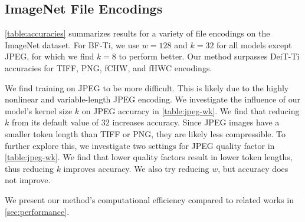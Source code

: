 \subsection{ImageNet File Encodings}
\autoref{table:accuracies} summarizes results for a variety of file encodings on the ImageNet dataset. For BF-Ti, we use $w=128$ and $k=32$ for all models except JPEG, for which we find $k=8$ to perform better. Our method surpasses DeiT-Ti accuracies for TIFF, PNG, fCHW, and fHWC encodings.

We find training on JPEG to be more difficult. This is likely due to the highly nonlinear and variable-length JPEG encoding. We investigate the influence of our model's kernel size $k$ on JPEG accuracy in \autoref{table:jpeg-wk}. We find that reducing $k$ from its default value of $32$ increases accuracy. Since JPEG images have a smaller token length than TIFF or PNG, they are likely less compressible. To further explore this, we investigate two settings for JPEG quality factor in \autoref{table:jpeg-wk}. We find that lower quality factors result in lower token lengths, thus reducing $k$ improves accuracy. We also try reducing $w$, but accuracy does not improve.

We present our method's computational efficiency compared to related works in \autoref{sec:performance}.

